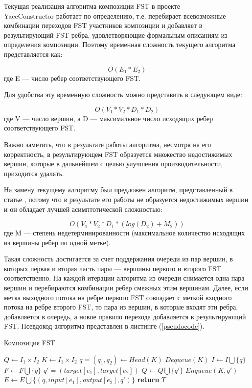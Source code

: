 Текущая реализация алгоритма композиции FST в проекте\\ YaccConstructor работает по определению, т.е. перебирает всевозможные комбинации переходов FST участников композиции и добавляет в результирующий FST ребра, удовлетворяющие формальным описаниям из определения композиции. Поэтому временная сложность текущего алгоритма представляется как:

\[O(E_1 * E_2)\] где E — число ребер соответствующего FST.

Для удобства эту временную сложность можно представить в следующем виде:

\[O(V_1 * V_2 * D_1 * D_2)\] где V — число вершин, а D — максимальное число исходящих ребер соответствующего FST.

Важно заметить, что в результате работы алгоритма, несмотря на его корректность, в результирующем FST образуется множество недостижимых вершин, которые в дальнейшем с целью улучшения производительности, приходится удалять.

На замену текущему алгоритму был предложен алгоритм, представленный в статье \cite{handbook_automata}, потому что в результате его работы не образуется недостижимых вершин и он обладает лучшей асимптотической сложностью:

\[O(V_1 * V_2 * D_1 * (log(D_2) + M_2))\] где M — степень недетерминированности (максимальное количество исходящих из вершины ребер по одной метке).

Такая сложность достигается за счет поддержания очереди из пар вершин, в которых первая и вторая часть пары — вершины первого и второго FST соответственно. На каждой итерации алгоритма из очереди снимается одна пара вершин и перебираются комбинации ребер смежных этим вершинам. Далее, если метка выходного потока на ребре первого FST совпадает с меткой входного потока на ребре второго FST, то пара из вершин, в которые входят эти ребра, добавляется в очередь, а новое правило перехода добавляется в результирующий FST. Псевдокод алгоритма представлен в листинге (\ref{pseudocode}).

\begin{algorithm}[h]
 \caption{Композиция FST}
 \label{pseudocode}
 \begin{algorithmic}[1]
 \State $Q\gets I_1\times I_2$
 \State $K\gets I_1\times I_2$ 
   \State $q = (q_1, q_2)\gets Head(K)$
   \State $Dequeue(K)$
     \State $I \gets I \bigcup \{q\}$
   \EndIf
     \State $F \gets F \bigcup \{q\}$
   \EndIf
     \State $q' = (target[e_1], target[e_2])$
       \State $Q\gets Q \bigcup \{q'\}$
       \State $Enqueue(K, q')$
     \EndIf
     \State $E\gets E \bigcup \{(q, input[e_1], output[e_2], q')\}$
   \EndFor
 \EndWhile  
 \State \textbf{return} $T$
 \EndProcedure
\end{algorithmic}
\end{algorithm}

